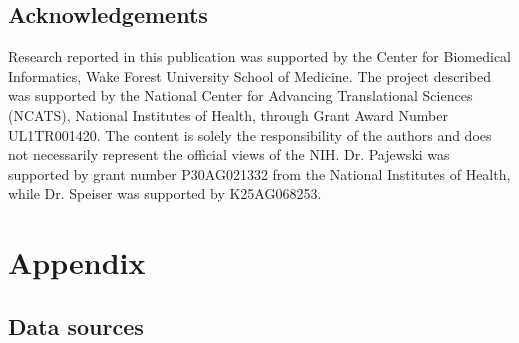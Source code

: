 \documentclass{article}\usepackage[]{graphicx}\usepackage[]{xcolor}
\begin{document}
\subsection*{Acknowledgements}

Research reported in this publication was supported by the Center for Biomedical Informatics, Wake Forest University School of Medicine. The project described was supported by the National Center for Advancing Translational Sciences (NCATS), National Institutes of Health, through Grant Award Number UL1TR001420. The content is solely the responsibility of the authors and does not necessarily represent the official views of the NIH. Dr. Pajewski was supported by grant number P30AG021332 from the National Institutes of Health, while Dr. Speiser was supported by K25AG068253.


\newpage

\appendix

\section*{Appendix}
\captionsetup{labelformat=AppendixTables}
\setcounter{table}{0}

\subsection*{Data sources}
\end{document}
